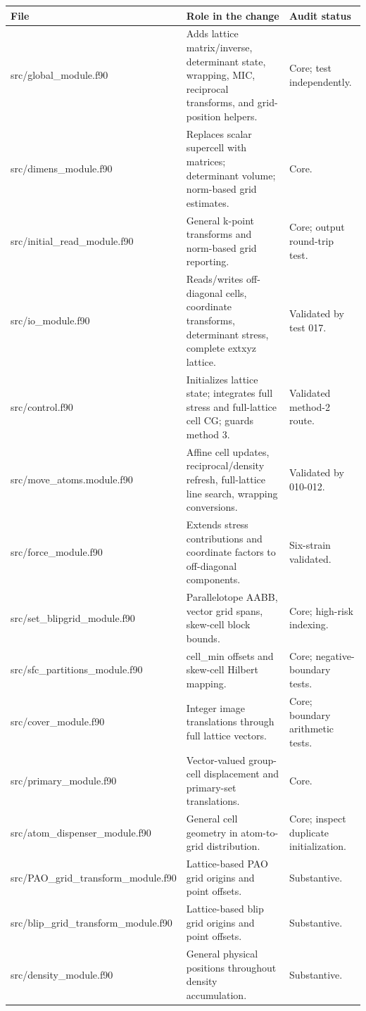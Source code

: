 \documentclass[10pt,a4paper]{report}
\begin{document}
\small\begin{longtable}{p{}|p{}|p{}}
\toprule File & Role in the change & Audit status\\ \midrule\endhead
src/global\_module.f90 & Adds lattice matrix/inverse, determinant state, wrapping, MIC, reciprocal transforms, and grid-position helpers. & Core; test independently.\\
src/dimens\_module.f90 & Replaces scalar supercell with matrices; determinant volume; norm-based grid estimates. & Core.\\
src/initial\_read\_module.f90 & General k-point transforms and norm-based grid reporting. & Core; output round-trip test.\\
src/io\_module.f90 & Reads/writes off-diagonal cells, coordinate transforms, determinant stress, complete extxyz lattice. & Validated by test 017.\\
src/control.f90 & Initializes lattice state; integrates full stress and full-lattice cell CG; guards method 3. & Validated method-2 route.\\
src/move\_atoms.module.f90 & Affine cell updates, reciprocal/density refresh, full-lattice line search, wrapping conversions. & Validated by 010-012.\\
src/force\_module.f90 & Extends stress contributions and coordinate factors to off-diagonal components. & Six-strain validated.\\
src/set\_blipgrid\_module.f90 & Parallelotope AABB, vector grid spans, skew-cell block bounds. & Core; high-risk indexing.\\
src/sfc\_partitions\_module.f90 & cell\_min offsets and skew-cell Hilbert mapping. & Core; negative-boundary tests.\\
src/cover\_module.f90 & Integer image translations through full lattice vectors. & Core; boundary arithmetic tests.\\
src/primary\_module.f90 & Vector-valued group-cell displacement and primary-set translations. & Core.\\
src/atom\_dispenser\_module.f90 & General cell geometry in atom-to-grid distribution. & Core; inspect duplicate initialization.\\
src/PAO\_grid\_transform\_module.f90 & Lattice-based PAO grid origins and point offsets. & Substantive.\\
src/blip\_grid\_transform\_module.f90 & Lattice-based blip grid origins and point offsets. & Substantive.\\
src/density\_module.f90 & General physical positions throughout density accumulation. & Substantive.\\

\end{longtable}
\end{document}
